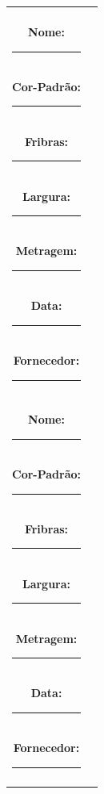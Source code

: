 \documentclass[
]{article}
\begin{document}
\begin{center}
\begin{tabular}{cc}
\begin{minipage}[t]{0.42\textwidth}
\small
\fbox{\rule{0pt}{3cm}\rule{5cm}{0pt}} \\[0.2cm]
\textbf{Nome:} \rule{Xcm}{0.4pt} \\
\textbf{Cor-Padrão:} \rule{4.2cm}{0.4pt} \\
\textbf{Fribras:} \rule{4.2cm}{0.4pt} \\
\textbf{Largura:} \rule{4.7cm}{0.4pt} \\
\textbf{Metragem:} \rule{4.5cm}{0.4pt} \\
\textbf{Data:} \rule{5cm}{0.4pt} \\
\textbf{Fornecedor:} \rule{4.3cm}{0.4pt} \\[0.2cm]
\end{minipage}
 & 
\begin{minipage}[t]{0.42\textwidth}
\small
\fbox{\rule{0pt}{3cm}\rule{5cm}{0pt}} \\[0.2cm]
\textbf{Nome:} \rule{Xcm}{0.4pt} \\
\textbf{Cor-Padrão:} \rule{4.2cm}{0.4pt} \\
\textbf{Fribras:} \rule{4.2cm}{0.4pt} \\
\textbf{Largura:} \rule{4.7cm}{0.4pt} \\
\textbf{Metragem:} \rule{4.5cm}{0.4pt} \\
\textbf{Data:} \rule{5cm}{0.4pt} \\
\textbf{Fornecedor:} \rule{4.3cm}{0.4pt} \\[0.2cm]
\end{minipage}
 \\ [1cm]


\end{tabular}
\end{center}
\end{document}

